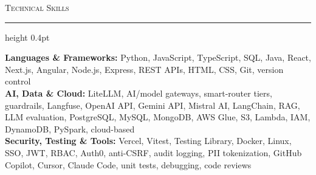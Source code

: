 \documentclass[letterpaper,11pt]{article}
\newcommand{\resumesection}[1]{%
  \par\vspace{2pt}%
  {\large\scshape #1}\par\vspace{2pt}%
  \hrule height 0.4pt\vspace{2pt}%
}
\begin{document}
\vspace{-4pt}
\resumesection{Technical Skills}
\textbf{Languages \& Frameworks:} Python, JavaScript, TypeScript, SQL, Java, React, Next.js, Angular, Node.js, Express, REST APIs, HTML, CSS, Git, version control\\
\textbf{AI, Data \& Cloud:} LiteLLM, AI/model gateways, smart-router tiers, guardrails, Langfuse, OpenAI API, Gemini API, Mistral AI, LangChain, RAG, LLM evaluation, PostgreSQL, MySQL, MongoDB, AWS Glue, S3, Lambda, IAM, DynamoDB, PySpark, cloud-based\\
\textbf{Security, Testing \& Tools:} Vercel, Vitest, Testing Library, Docker, Linux, SSO, JWT, RBAC, Auth0, anti-CSRF, audit logging, PII tokenization, GitHub Copilot, Cursor, Claude Code, unit tests, debugging, code reviews
\end{document}
